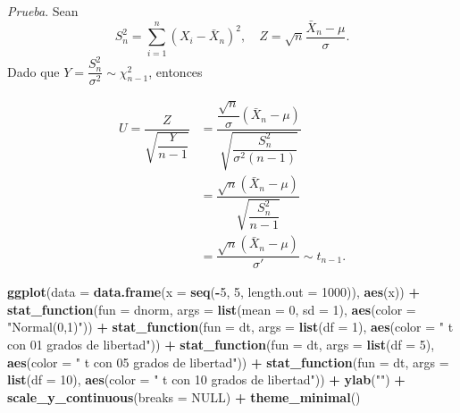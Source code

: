 \documentclass[
  12pt,
]{book}
\newenvironment{Shaded}{\begin{snugshade}}{\end{snugshade}}
\newcommand{\DataTypeTok}[1]{\textcolor[rgb]{0.13,0.29,0.53}{#1}}
\newcommand{\DecValTok}[1]{\textcolor[rgb]{0.00,0.00,0.81}{#1}}
\newcommand{\KeywordTok}[1]{\textcolor[rgb]{0.13,0.29,0.53}{\textbf{#1}}}
\newcommand{\NormalTok}[1]{#1}
\newcommand{\OperatorTok}[1]{\textcolor[rgb]{0.81,0.36,0.00}{\textbf{#1}}}
\newcommand{\OtherTok}[1]{\textcolor[rgb]{0.56,0.35,0.01}{#1}}
\newcommand{\StringTok}[1]{\textcolor[rgb]{0.31,0.60,0.02}{#1}}
\begin{document}
\emph{Prueba}. Sean
\[S_n^2=\sum_{i=1}^n(X_i-\bar X_n)^2, \quad Z = \sqrt n \dfrac{\bar X_n-\mu}{\sigma}. \]
Dado que \(Y = \dfrac{S_n^2}{\sigma^2}\sim \chi^2_{n-1}\), entonces

\begin{align*}
U = \dfrac{Z}{\sqrt{\dfrac Y{n-1}}} & = \dfrac{\dfrac{\sqrt n}\sigma (\bar X_n-\mu)}{\sqrt{\dfrac{S_n^2}{\sigma^2(n-1)}}} \\ & = \dfrac{\sqrt n (\bar X_n-\mu)}{\sqrt{\dfrac{S_n^2}{n-1}}}\\& = \dfrac{\sqrt n (\bar X_n-\mu)}{\sigma'} \sim t_{n-1}.
\end{align*}

\begin{Shaded}
\begin{Highlighting}[]
\KeywordTok{ggplot}\NormalTok{(}\DataTypeTok{data =} \KeywordTok{data.frame}\NormalTok{(}\DataTypeTok{x =} \KeywordTok{seq}\NormalTok{(}\OperatorTok{{-}}\DecValTok{5}\NormalTok{, }\DecValTok{5}\NormalTok{, }\DataTypeTok{length.out =} \DecValTok{1000}\NormalTok{)), }
    \KeywordTok{aes}\NormalTok{(x)) }\OperatorTok{+}\StringTok{ }\KeywordTok{stat\_function}\NormalTok{(}\DataTypeTok{fun =}\NormalTok{ dnorm, }\DataTypeTok{args =} \KeywordTok{list}\NormalTok{(}\DataTypeTok{mean =} \DecValTok{0}\NormalTok{, }
    \DataTypeTok{sd =} \DecValTok{1}\NormalTok{), }\KeywordTok{aes}\NormalTok{(}\DataTypeTok{color =} \StringTok{"Normal(0,1)"}\NormalTok{)) }\OperatorTok{+}\StringTok{ }\KeywordTok{stat\_function}\NormalTok{(}\DataTypeTok{fun =}\NormalTok{ dt, }
    \DataTypeTok{args =} \KeywordTok{list}\NormalTok{(}\DataTypeTok{df =} \DecValTok{1}\NormalTok{), }\KeywordTok{aes}\NormalTok{(}\DataTypeTok{color =} \StringTok{" t con 01 grados de libertad"}\NormalTok{)) }\OperatorTok{+}\StringTok{ }
\StringTok{    }\KeywordTok{stat\_function}\NormalTok{(}\DataTypeTok{fun =}\NormalTok{ dt, }\DataTypeTok{args =} \KeywordTok{list}\NormalTok{(}\DataTypeTok{df =} \DecValTok{5}\NormalTok{), }\KeywordTok{aes}\NormalTok{(}\DataTypeTok{color =} \StringTok{" t con 05 grados de libertad"}\NormalTok{)) }\OperatorTok{+}\StringTok{ }
\StringTok{    }\KeywordTok{stat\_function}\NormalTok{(}\DataTypeTok{fun =}\NormalTok{ dt, }\DataTypeTok{args =} \KeywordTok{list}\NormalTok{(}\DataTypeTok{df =} \DecValTok{10}\NormalTok{), }\KeywordTok{aes}\NormalTok{(}\DataTypeTok{color =} \StringTok{" t con 10 grados de libertad"}\NormalTok{)) }\OperatorTok{+}\StringTok{ }
\StringTok{    }\KeywordTok{ylab}\NormalTok{(}\StringTok{""}\NormalTok{) }\OperatorTok{+}\StringTok{ }\KeywordTok{scale\_y\_continuous}\NormalTok{(}\DataTypeTok{breaks =} \OtherTok{NULL}\NormalTok{) }\OperatorTok{+}\StringTok{ }
\StringTok{    }\KeywordTok{theme\_minimal}\NormalTok{()}
\end{Highlighting}
\end{Shaded}
\end{document}
